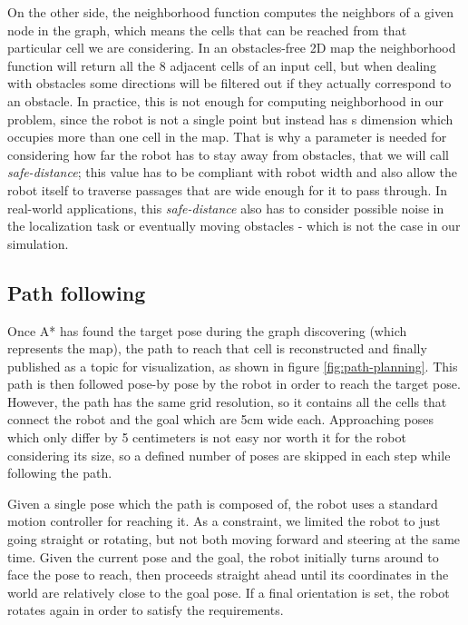 \documentclass[9pt,conference]{IEEEtran}
\begin{document}
On the other side, the neighborhood function computes the neighbors of a given node in the graph, which means the cells that can be reached from that particular cell we are considering. In an obstacles-free 2D map the neighborhood function will return all the 8 adjacent cells of an input cell, but when dealing with obstacles some directions will be filtered out if they actually correspond to an obstacle. In practice, this is not enough for computing neighborhood in our problem, since the robot is not a single point but instead has s dimension which occupies more than one cell in the map. That is why a parameter is needed for considering how far the robot has to stay away from obstacles, that we will call \textit{safe-distance}; this value has to be compliant with robot width and also allow the robot itself to traverse passages that are wide enough for it to pass through. In real-world applications, this \textit{safe-distance} also has to consider possible noise in the localization task or eventually moving obstacles - which is not the case in our simulation.


\subsection{Path following}
\label{sec:path-following}

Once A* has found the target pose during the graph discovering (which represents the map), the path to reach that cell is reconstructed and finally published as a topic for visualization, as shown in figure \ref{fig:path-planning}. This path is then followed pose-by pose by the robot in order to reach the target pose. However, the path has the same grid resolution, so it contains all the cells that connect the robot and the goal which are 5cm wide each. Approaching poses which only differ by 5 centimeters is not easy nor worth it for the robot considering its size, so a defined number of poses are skipped in each step while following the path.

Given a single pose which the path is composed of, the robot uses a standard motion controller for reaching it. As a constraint, we limited the robot to just going straight or rotating, but not both moving forward and steering at the same time. Given the current pose and the goal, the robot initially turns around to face the pose to reach, then proceeds straight ahead until its coordinates in the world are relatively close to the goal pose. If a final orientation is set, the robot rotates again in order to satisfy the requirements.
\end{document}
